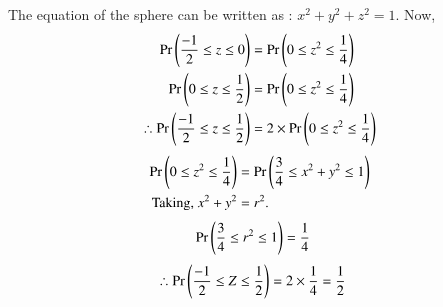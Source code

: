 The equation of the sphere can be written as :
\begin{math}
x^2 + y^2 + z^2 = 1.
\end{math}
Now,
\begin{align}
\Pr\left(\frac{-1}{2} \leq z \leq 0\right)&=\Pr\left(0 \leq z^2 \leq \frac{1}{4}\right)
\\\Pr\left(0 \leq z \leq \frac{1}{2}\right)&=\Pr\left(0 \leq z^2 \leq \frac{1}{4}\right)
\\\therefore \Pr\left(\frac{-1}{2} \leq z \leq \frac{1}{2}\right)&=2 \times \Pr\left(0 \leq z^2 \leq \frac{1}{4}\right)
\end{align}
\begin{align}
\Pr\left(0 \leq z^2 \leq \frac{1}{4}\right)&=\Pr\left(\frac{3}{4} \leq x^2+y^2 \leq 1\right)
\\\text{Taking, } x^2+y^2&=r^2.
\end{align}
\begin{align}
     \Pr\left(\frac{3}{4} \leq r^2 \leq 1\right) &= \frac{1}{4}
\end{align}
\begin{align}
     \therefore \Pr\left(\frac{-1}{2} \leq Z \leq \frac{1}{2}\right) &= 2 \times \frac{1}{4} = \frac{1}{2}
\end{align}